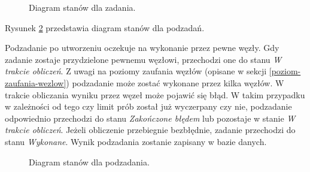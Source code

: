 \documentclass[a4paper,11pt,twoside]{report}
\theoremstyle{definition}
\begin{document}
\begin{figure}[H] 
	\caption{Diagram stanów dla zadania.}
	\label{task-state-diagram}
\end{figure}

Rysunek \ref{subtask-state-diagram} przedstawia diagram stanów dla podzadań.

Podzadanie po utworzeniu oczekuje na wykonanie przez pewne węzły. Gdy zadanie zostaje przydzielone pewnemu węzłowi, przechodzi one do stanu \textit{W trakcie obliczeń}. Z uwagi na poziomy zaufania węzłów (opisane w sekcji \ref{poziom-zaufania-wezlow}) podzadanie może zostać wykonane przez kilka węzłów. W trakcie obliczania wyniku przez węzeł może pojawić się błąd. W takim przypadku w zależności od tego czy limit prób został już wyczerpany czy nie, podzadanie odpowiednio przechodzi do stanu \textit{Zakończone błędem} lub pozostaje w stanie \textit{W trakcie obliczeń}. Jeżeli obliczenie przebiegnie bezbłędnie, zadanie przechodzi do stanu \textit{Wykonane}. Wynik podzadania zostanie zapisany w bazie danych.

\begin{figure}[H] 
	\caption{Diagram stanów dla podzadania.}
	\label{subtask-state-diagram}
\end{figure}
\end{document}
